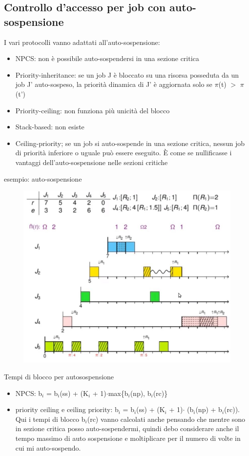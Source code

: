 \documentclass[12pt, oneside]{extbook}
\begin{document}
\subsection{Controllo d'accesso per job con auto-sospensione}
I vari protocolli vanno adattati all'auto-sospensione:
\begin{itemize}
\item NPCS: non è possibile auto-sospendersi in una sezione critica
\item Priority-inheritance: se un job J è bloccato su una risorsa posseduta da un job J' auto-sospeso, la priorità dinamica di J' è aggiornata solo se $\pi$(t) $>$ $\pi$(t')
\item Priority-ceiling: non funziona più unicità del blocco
\item Stack-based: non esiste
\item Ceiling-priority; se un job si auto-sospende in una sezione critica, nessun job di priorità inferiore o uguale può essere eseguito. È come se nullificasse i vantaggi dell'auto-sospensione nelle sezioni critiche
\end{itemize}
esempio: auto-sospensione\\
\begin{figure}[!h]
\centering
\includegraphics[scale=0.4]{immagini/image-033.jpg}
\end{figure}
Tempi di blocco per autosospensione
\begin{itemize}
\item NPCS: b$_{i}$ = b$_{i}$(ss) + (K$_{i}$ + 1)$\cdot$max\{b$_{i}$(np), b$_{i}$(rc)\}
\item priority ceiling e ceiling priority: b$_{i}$ = b$_{i}$(ss) + (K$_{i}$ + 1)$\cdot$ (b$_{i}$(np) + b$_{i}$(rc)). Qui i tempi di blocco b$_{i}$(rc) vanno calcolati anche pensando che mentre sono in sezione critica posso auto-sospendermi, quindi debo considerare anche il tempo massimo di auto sospensione e moltiplicare per il numero di volte in cui mi auto-sospendo.
\end{itemize}
\end{document}
